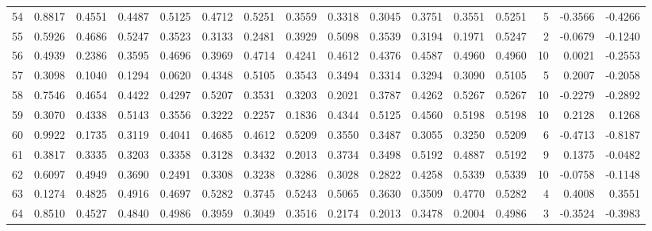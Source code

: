 \begin{tabular}{lrrrrrrrrrrrrrrr}
54  &      0.8817 &  0.4551 &  0.4487 &  0.5125 &  0.4712 &  0.5251 &  0.3559 &  0.3318 &  0.3045 &  0.3751 &   0.3551 &     0.5251 &      5 &                   -0.3566 &                    -0.4266 \\
55  &      0.5926 &  0.4686 &  0.5247 &  0.3523 &  0.3133 &  0.2481 &  0.3929 &  0.5098 &  0.3539 &  0.3194 &   0.1971 &     0.5247 &      2 &                   -0.0679 &                    -0.1240 \\
56  &      0.4939 &  0.2386 &  0.3595 &  0.4696 &  0.3969 &  0.4714 &  0.4241 &  0.4612 &  0.4376 &  0.4587 &   0.4960 &     0.4960 &     10 &                    0.0021 &                    -0.2553 \\
57  &      0.3098 &  0.1040 &  0.1294 &  0.0620 &  0.4348 &  0.5105 &  0.3543 &  0.3494 &  0.3314 &  0.3294 &   0.3090 &     0.5105 &      5 &                    0.2007 &                    -0.2058 \\
58  &      0.7546 &  0.4654 &  0.4422 &  0.4297 &  0.5207 &  0.3531 &  0.3203 &  0.2021 &  0.3787 &  0.4262 &   0.5267 &     0.5267 &     10 &                   -0.2279 &                    -0.2892 \\
59  &      0.3070 &  0.4338 &  0.5143 &  0.3556 &  0.3222 &  0.2257 &  0.1836 &  0.4344 &  0.5125 &  0.4560 &   0.5198 &     0.5198 &     10 &                    0.2128 &                     0.1268 \\
60  &      0.9922 &  0.1735 &  0.3119 &  0.4041 &  0.4685 &  0.4612 &  0.5209 &  0.3550 &  0.3487 &  0.3055 &   0.3250 &     0.5209 &      6 &                   -0.4713 &                    -0.8187 \\
61  &      0.3817 &  0.3335 &  0.3203 &  0.3358 &  0.3128 &  0.3432 &  0.2013 &  0.3734 &  0.3498 &  0.5192 &   0.4887 &     0.5192 &      9 &                    0.1375 &                    -0.0482 \\
62  &      0.6097 &  0.4949 &  0.3690 &  0.2491 &  0.3308 &  0.3238 &  0.3286 &  0.3028 &  0.2822 &  0.4258 &   0.5339 &     0.5339 &     10 &                   -0.0758 &                    -0.1148 \\
63  &      0.1274 &  0.4825 &  0.4916 &  0.4697 &  0.5282 &  0.3745 &  0.5243 &  0.5065 &  0.3630 &  0.3509 &   0.4770 &     0.5282 &      4 &                    0.4008 &                     0.3551 \\
64  &      0.8510 &  0.4527 &  0.4840 &  0.4986 &  0.3959 &  0.3049 &  0.3516 &  0.2174 &  0.2013 &  0.3478 &   0.2004 &     0.4986 &      3 &                   -0.3524 &                    -0.3983 \\

\end{tabular}
